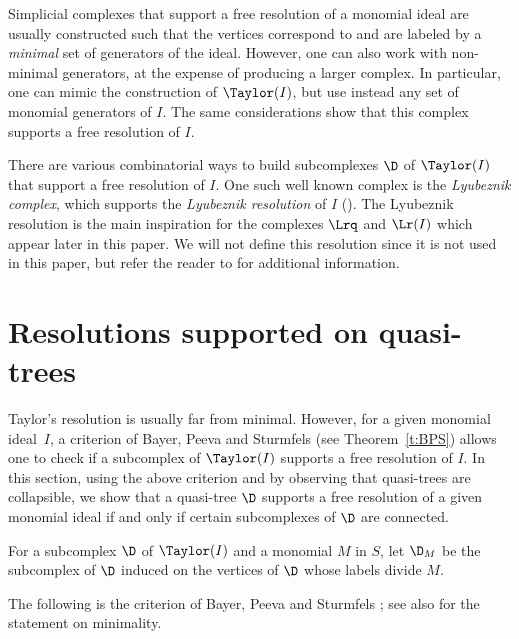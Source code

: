 \begin{rema} \label{r:larger-Taylor}
Simplicial complexes that support a
free resolution of a monomial ideal are usually constructed such that the
vertices correspond to and are labeled by a {\it minimal} set of
generators of the ideal. However, one can also work with non-minimal
generators, at the expense of producing a larger complex. In
particular, one can mimic the construction of $\Taylor(I)$, but use
instead any set of monomial generators of $I$. The same
considerations show that this complex supports a free resolution of
$I$.
\end{rema}

There are various combinatorial ways to build subcomplexes
        $\D$ of $\Taylor(I)$ that support a free resolution of
        $I$. One such well known complex is the {\it Lyubeznik
          complex}, which supports the {\it Lyubeznik resolution} of
        $I$ \textup{(}\cite{L}\textup{)}. The Lyubeznik resolution is the main
        inspiration for the complexes $\Lrq$ and $\Lr(I)$ which appear
        later in this paper.  We will not define this resolution since
        it is not used in this paper, but refer the reader to \cite{L,M}
        for additional information.


\section{Resolutions supported on quasi-trees}
\label{sec:res-by-qtrees}

 Taylor's resolution is usually far from
        minimal. However, for a given monomial ideal~$I$, a
        criterion of Bayer, Peeva and Sturmfels \textup{(}see Theorem~\ref{t:BPS}\textup{)}
        allows one to check if a subcomplex of $\Taylor(I)$ supports a
        free resolution of $I$. In this section, using the above
        criterion and by observing that quasi-trees are collapsible,
        we show that a quasi-tree $\D$ supports a free resolution
        of a given monomial ideal if and only if certain subcomplexes
        of $\D$ are connected.

        For a subcomplex $\D$ of $\Taylor(I)$ and a
        monomial $M$ in $S$, let $\D_M$ be the subcomplex of $\D$
        induced on the vertices of $\D$ whose labels divide $M$.

        The following is the criterion of Bayer, Peeva and Sturmfels
        \cite[Lemma 2.2]{BPS}; see also \cite[Theorem 2.2]{E} for the
        statement on minimality.


